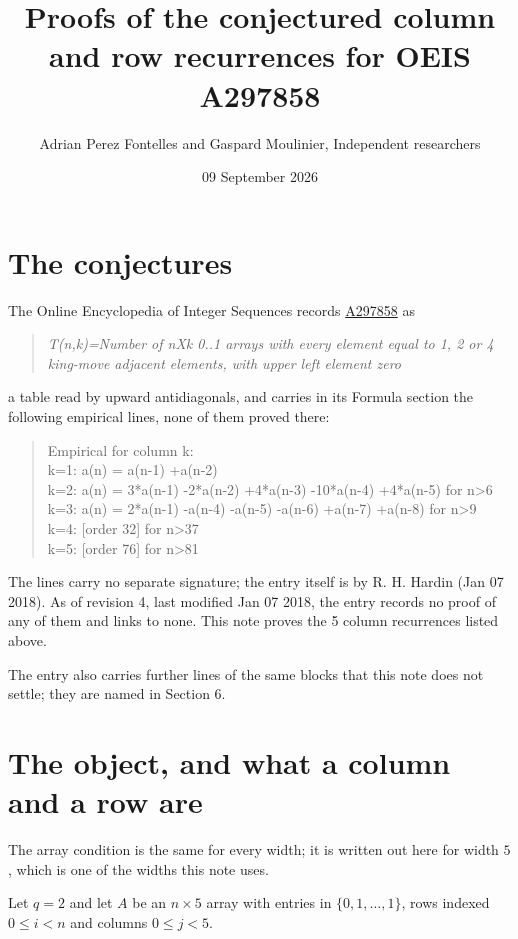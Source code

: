 \documentclass[11pt]{article}
\title{Proofs of the conjectured column and row recurrences for OEIS A297858}
\author{Adrian Perez Fontelles and Gaspard Moulinier, Independent researchers}
\date{09 September 2026}
\theoremstyle{definition}
\begin{document}
\maketitle
\section{The conjectures}

The Online Encyclopedia of Integer Sequences records \href{https://oeis.org/A297858}{A297858} as

\begin{quote}\itshape T(n,k)=Number of nXk 0..1 arrays with every element equal to 1, 2 or 4 king-move adjacent elements, with upper left element zero\end{quote}

a table read by upward antidiagonals, and carries in its Formula section the following empirical lines, none of them proved there:

\begin{quote}\ttfamily Empirical for column k:\\
k=1: a(n) = a(n-1) +a(n-2)\\k=2: a(n) = 3*a(n-1) -2*a(n-2) +4*a(n-3) -10*a(n-4) +4*a(n-5) for n>6\\k=3: a(n) = 2*a(n-1) -a(n-4) -a(n-5) -a(n-6) +a(n-7) +a(n-8) for n>9\\k=4: [order 32] for n>37\\k=5: [order 76] for n>81\end{quote}

The lines carry no separate signature; the entry itself is by R. H. Hardin (Jan 07 2018). As of revision 4, last modified Jan 07 2018, the entry records no proof of any of them and links to none. This note proves the 5 column recurrences listed above.

The entry also carries further lines of the same blocks that this note does not settle; they are named in Section 6.

\section{The object, and what a column and a row are}

The array condition is the same for every width; it is written out here for width $5$, which is one of the widths this note uses.

Let $q = 2$ and let $A$ be an $n \times 5$ array with entries in $\{0,1,\dots,1\}$, rows indexed $0 \le i < n$ and columns $0 \le j < 5$.
\end{document}
